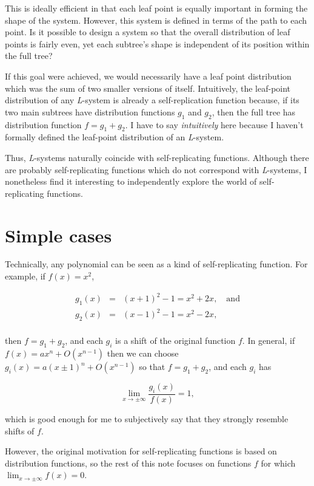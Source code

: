\documentclass[20pt,]{extarticle}
\begin{document}
This is ideally efficient in that each leaf point is equally important
in forming the shape of the system. However, this system is defined in
terms of the path to each point. Is it possible to design a system so
that the overall distribution of leaf points is fairly even, yet each
subtree's shape is independent of its position within the full tree?

If this goal were achieved, we would necessarily have a leaf point
distribution which was the sum of two smaller versions of itself.
Intuitively, the leaf-point distribution of any \emph{L}-system is
already a self-replication function because, if its two main subtrees
have distribution functions \(g_1\) and \(g_2\), then the full tree has
distribution function \(f = g_1 + g_2\). I have to say
\emph{intuitively} here because I haven't formally defined the
leaf-point distribution of an \emph{L}-system.

Thus, \emph{L}-systems naturally coincide with self-replicating
functions. Although there are probably self-replicating functions which
do not correspond with \emph{L}-systems, I nonetheless find it
interesting to independently explore the world of self-replicating
functions.

\section{Simple cases}\label{simple-cases}

Technically, any polynomial can be seen as a kind of self-replicating
function. For example, if \(f(x) = x^2\),

\[\begin{array}{rcl}
  g_1(x) & = & (x + 1)^2 - 1 = x^2 + 2x, \quad \text{and} \\
  g_2(x) & = & (x - 1)^2 - 1 = x^2 - 2x, \\
\end{array}\]

then \(f = g_1 + g_2\), and each \(g_i\) is a shift of the original
function \(f\). In general, if \(f(x) = ax^n + O(x^{n-1})\) then we can
choose \(g_i(x) = a(x\pm 1)^n + O(x^{n-1})\) so that \(f = g_1 + g_2\),
and each \(g_i\) has

\[ \lim_{x\to\pm\infty}\frac{g_i(x)}{f(x)} = 1,\]

which is good enough for me to subjectively say that they strongly
resemble shifts of \(f\).

However, the original motivation for self-replicating functions is based
on distribution functions, so the rest of this note focuses on functions
\(f\) for which \(\lim_{x\to\pm\infty}f(x) = 0\).
\end{document}
